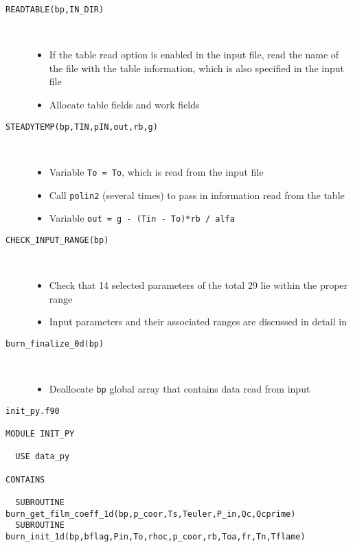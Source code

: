 \begin{description}
\item[\texttt{READTABLE(bp,IN\_DIR)}]{\hfill \\ \vspace{-15pt}
\begin{itemize}
\item{If the table read option is enabled in the input file, read the name of the file with the table information, which is also specified in the input file}
\item{Allocate table fields and work fields}
\end{itemize}
}

\item[\texttt{STEADYTEMP(bp,TIN,pIN,out,rb,g)}]{\hfill \\ \vspace{-15pt}
\begin{itemize}
\item{Variable \texttt{To = To}, which is read from the input file}
\item{Call \texttt{polin2} (several times) to pass in information read from the table}
\item{Variable \texttt{out = g - (Tin - To)*rb / alfa}}
\end{itemize}
}

\item[\texttt{CHECK\_INPUT\_RANGE(bp)}]{\hfill \\ \vspace{-15pt}
\begin{itemize}
\item{Check that 14 selected parameters of the total 29 lie within the proper range}
\item{Input parameters and their associated ranges are discussed in detail in }
\end{itemize}
}

\item[\texttt{burn\_finalize\_0d(bp)}]{\hfill \\ \vspace{-15pt}
\begin{itemize}
\item{Deallocate \texttt{bp} global array that contains data read from input}
\end{itemize}
}

\end{description}


\begin{Verbatim}[frame=single]
                              init_py.f90

MODULE INIT_PY

  USE data_py

CONTAINS

  SUBROUTINE burn_get_film_coeff_1d(bp,p_coor,Ts,Teuler,P_in,Qc,Qcprime)
  SUBROUTINE burn_init_1d(bp,bflag,Pin,To,rhoc,p_coor,rb,Toa,fr,Tn,Tflame)    
\end{Verbatim}

